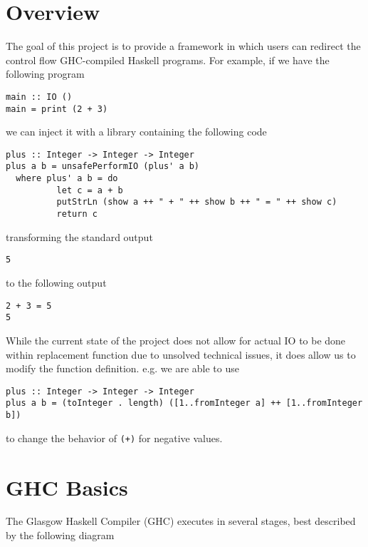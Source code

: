\documentclass[letterpaper]{article}
\begin{document}
\section{Overview}

The goal of this project is to provide a framework in which users can redirect
the control flow GHC-compiled Haskell programs. For example, if we have the
following program

\begin{verbatim}
main :: IO ()
main = print (2 + 3)
\end{verbatim}

we can inject it with a library containing the following code

\begin{verbatim}
plus :: Integer -> Integer -> Integer
plus a b = unsafePerformIO (plus' a b)
  where plus' a b = do
          let c = a + b
          putStrLn (show a ++ " + " ++ show b ++ " = " ++ show c)
          return c
\end{verbatim}

transforming the standard output

\begin{verbatim}
5
\end{verbatim}

to the following output

\begin{verbatim}
2 + 3 = 5
5
\end{verbatim}

While the current state of the project does not allow for actual IO to be done
within replacement function due to unsolved technical issues, it does allow us
to modify the function definition. e.g. we are able to use

\begin{verbatim}
plus :: Integer -> Integer -> Integer
plus a b = (toInteger . length) ([1..fromInteger a] ++ [1..fromInteger b])
\end{verbatim}

to change the behavior of \texttt{(+)} for negative values.

\section{GHC Basics}

The Glasgow Haskell Compiler (GHC) executes in several stages, best described by
the following diagram
\end{document}

